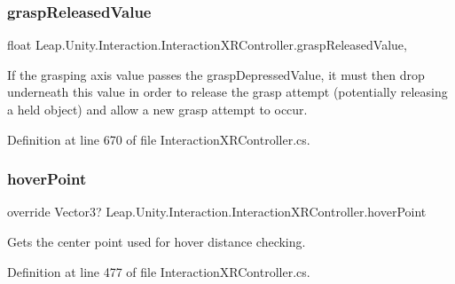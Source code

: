\subsubsection{\texorpdfstring{graspReleasedValue}{graspReleasedValue}}
{\footnotesize\ttfamily float Leap.\+Unity.\+Interaction.\+Interaction\+X\+R\+Controller.\+grasp\+Released\+Value\hspace{0.3cm}{\ttfamily [get]}, {\ttfamily [set]}}



If the grasping axis value passes the grasp\+Depressed\+Value, it must then drop underneath this value in order to release the grasp attempt (potentially releasing a held object) and allow a new grasp attempt to occur. 



Definition at line 670 of file Interaction\+X\+R\+Controller.\+cs.

\mbox{\label{class_leap_1_1_unity_1_1_interaction_1_1_interaction_x_r_controller_a162487d30c42a8d26711bf80e75230c8}} 
\subsubsection{\texorpdfstring{hoverPoint}{hoverPoint}}
{\footnotesize\ttfamily override Vector3? Leap.\+Unity.\+Interaction.\+Interaction\+X\+R\+Controller.\+hover\+Point\hspace{0.3cm}{\ttfamily [get]}}



Gets the center point used for hover distance checking. 



Definition at line 477 of file Interaction\+X\+R\+Controller.\+cs.

\mbox{\label{class_leap_1_1_unity_1_1_interaction_1_1_interaction_x_r_controller_a482076db355cd75653f6d9efc8015409}} 
